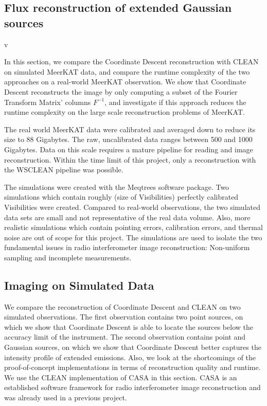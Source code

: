 \subsection{Flux reconstruction of extended Gaussian sources}



v


In this section, we compare the Coordinate Descent reconstruction with CLEAN on simulated MeerKAT data, and compare the runtime complexity of the two approaches on a real-world MeerKAT observation. We show that Coordinate Descent reconstructs the image by only computing a subset of the Fourier Transform Matrix' columns $F^{-1}$, and investigate if this approach reduces the runtime complexity on the large scale reconstruction problems of MeerKAT.


The real world MeerKAT data were calibrated and averaged down to reduce its size to 88 Gigabytes. The raw, uncalibrated data ranges between 500 and 1000 Gigabytes. Data on this scale requires a mature pipeline for reading and image reconstruction. Within the time limit of this project, only a reconstruction with the WSCLEAN\cite{offringa2014wsclean} pipeline was possible.

The simulations were created with the Meqtrees software package. Two simulations which contain roughly (size of Visibilities) perfectly calibrated Visibilities were created. Compared to real-world observations, the two simulated data sets are small and not representative of the real data volume. Also, more realistic simulations which contain pointing errors, calibration errors, and thermal noise are out of scope for this project. The simulations are used to isolate the two fundamental issues in radio interferometer image reconstruction: Non-uniform sampling and incomplete measurements.

\subsection{Imaging on Simulated Data}
We compare the reconstruction of Coordinate Descent and CLEAN on two simulated observations. The first observation contains two point sources, on which we show that Coordinate Descent is able to locate the sources below the accuracy limit of the instrument. The second observation contains point and Gaussian sources, on which we show that Coordinate Descent better captures the intensity profile of extended emissions. Also, we look at the shortcomings of the proof-of-concept implementations in terms of reconstruction quality and runtime. We use the CLEAN implementation of CASA in this section. CASA is an established software framework for radio interferometer image reconstruction and was already used in a previous project.


